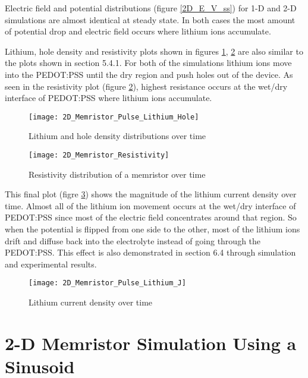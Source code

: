 \begin{doublespace}
Electric field and potential distributions (figure \ref{2D_E_V_ss}) for 1-D and 2-D simulations are almost identical at steady state. In both cases the most amount of potential drop and electric field occurs where lithium ions accumulate.

Lithium, hole density and resistivity plots shown in figures \ref{lit_hole_dist}, \ref{2dres} are also similar to the plots shown in section 5.4.1. For both of the simulations lithium ions move into the PEDOT:PSS until the dry region and push holes out of the device. As seen in the resistivity plot (figure \ref{2dres}), highest resistance occurs at the wet/dry interface of PEDOT:PSS where lithium ions accumulate. 

\begin{figure}[!htp]
\centering
\texttt{[image: 2D\_Memristor\_Pulse\_Lithium\_Hole]}
\caption{Lithium and hole density distributions over time} 
\label{lit_hole_dist}
\end{figure}

\begin{figure}[!htp]
\centering
\texttt{[image: 2D\_Memristor\_Resistivity]}
\caption{Resistivity distribution of a memristor over time} 
\label{2dres}
\end{figure}

This final plot (figre \ref{mag_lit_curr}) shows the magnitude of the lithium current density over time. Almost all of the lithium ion movement occurs at the wet/dry interface of PEDOT:PSS since most of the electric field concentrates around that region. So when the potential is flipped from one side to the other, most of the lithium ions drift and diffuse back into the electrolyte instead of going through the PEDOT:PSS. This effect is also demonstrated in section 6.4 through simulation and experimental results. 

\begin{figure}[!htp]
\centering
\texttt{[image: 2D\_Memristor\_Pulse\_Lithium\_J]}
\caption{Lithium current density over time} 
\label{mag_lit_curr}
\end{figure}


\clearpage
\section{2-D Memristor Simulation Using a Sinusoid}


\end{doublespace}

